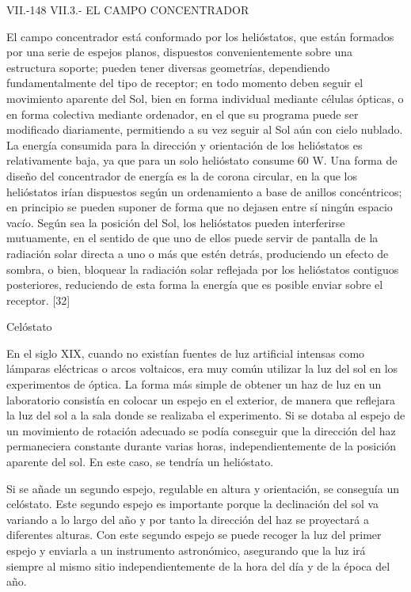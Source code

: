 \documentclass[12pt]{article}
\begin{document}
VII.-148 VII.3.- EL CAMPO CONCENTRADOR

El campo concentrador está conformado por los helióstatos, que están formados por una serie de espejos planos, dispuestos convenientemente sobre una estructura soporte; pueden tener diversas geometrías, dependiendo fundamentalmente del tipo de receptor; en todo momento deben seguir el movimiento aparente del Sol, bien en forma individual mediante células ópticas, o en forma colectiva mediante ordenador, en el que su programa puede ser modificado diariamente, permitiendo a su vez seguir al Sol aún con cielo nublado.
La energía consumida para la dirección y orientación de los helióstatos es relativamente baja, ya que para un solo helióstato consume 60 W.
Una forma de diseño del concentrador de energía es la de corona circular, en la que los helióstatos irían dispuestos según un ordenamiento a base de anillos concéntricos; en principio se pueden suponer de forma que no dejasen entre sí ningún espacio vacío.
Según sea la posición del Sol, los helióstatos pueden interferirse mutuamente, en el sentido de que uno de ellos puede servir de pantalla de la radiación solar directa a uno o más que estén detrás, produciendo un efecto de sombra, o bien, bloquear la radiación solar reflejada por los helióstatos contiguos posteriores, reduciendo de esta forma la energía que es posible enviar sobre el receptor. [32]



Celóstato

En el siglo XIX, cuando no existían fuentes de luz artificial intensas como lámparas eléctricas o arcos voltaicos, era muy común utilizar la luz del sol en los experimentos de óptica. La forma más simple de obtener un haz de luz en un laboratorio consistía en colocar un espejo en el exterior, de manera que reflejara la luz del sol a la sala donde se realizaba el experimento. Si se dotaba al espejo de un movimiento de rotación adecuado se podía conseguir que la dirección del haz permaneciera constante durante varias horas, independientemente de la posición aparente del sol. En este caso, se tendría un helióstato.

Si se añade un segundo espejo, regulable en altura y orientación, se conseguía un celóstato. Este segundo espejo es importante porque la declinación del sol va variando a lo largo del año y por tanto la dirección del haz se proyectará a diferentes alturas. Con este segundo espejo se puede recoger la luz del primer espejo y enviarla a un instrumento astronómico, asegurando que la luz irá siempre al mismo sitio independientemente de la hora del día y de la época del año.
\end{document}
